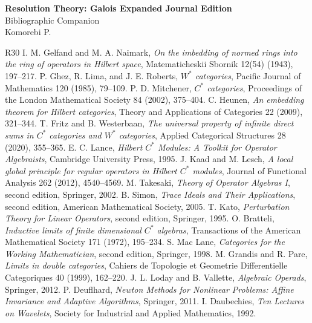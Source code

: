 \documentclass[9pt]{article}
\begin{document}
\begin{center}
{\Large\bfseries Resolution Theory: Galois Expanded Journal Edition}\\[4pt]
{\large Bibliographic Companion}\\[10pt]
Komorebi P.
\end{center}

\small
\begin{thebibliography}{R30}
 I. M. Gelfand and M. A. Naimark, \emph{On the imbedding of normed rings into the ring of operators in Hilbert space}, Matematicheskii Sbornik 12(54) (1943), 197--217.
 P. Ghez, R. Lima, and J. E. Roberts, \emph{\(W^*\) categories}, Pacific Journal of Mathematics 120 (1985), 79--109.
 P. D. Mitchener, \emph{\(C^*\) categories}, Proceedings of the London Mathematical Society 84 (2002), 375--404.
 C. Heunen, \emph{An embedding theorem for Hilbert categories}, Theory and Applications of Categories 22 (2009), 321--344.
 T. Fritz and B. Westerbaan, \emph{The universal property of infinite direct sums in \(C^*\) categories and \(W^*\) categories}, Applied Categorical Structures 28 (2020), 355--365.
 E. C. Lance, \emph{Hilbert \(C^*\) Modules: A Toolkit for Operator Algebraists}, Cambridge University Press, 1995.
 J. Kaad and M. Lesch, \emph{A local global principle for regular operators in Hilbert \(C^*\) modules}, Journal of Functional Analysis 262 (2012), 4540--4569.
 M. Takesaki, \emph{Theory of Operator Algebras I}, second edition, Springer, 2002.
 B. Simon, \emph{Trace Ideals and Their Applications}, second edition, American Mathematical Society, 2005.
 T. Kato, \emph{Perturbation Theory for Linear Operators}, second edition, Springer, 1995.
 O. Bratteli, \emph{Inductive limits of finite dimensional \(C^*\) algebras}, Transactions of the American Mathematical Society 171 (1972), 195--234.
 S. Mac Lane, \emph{Categories for the Working Mathematician}, second edition, Springer, 1998.
 M. Grandis and R. Pare, \emph{Limits in double categories}, Cahiers de Topologie et Geometrie Differentielle Categoriques 40 (1999), 162--220.
 J. L. Loday and B. Vallette, \emph{Algebraic Operads}, Springer, 2012.
 P. Deuflhard, \emph{Newton Methods for Nonlinear Problems: Affine Invariance and Adaptive Algorithms}, Springer, 2011.
 I. Daubechies, \emph{Ten Lectures on Wavelets}, Society for Industrial and Applied Mathematics, 1992.

\end{thebibliography}
\end{document}
